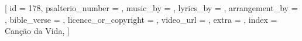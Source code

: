[
    id                     = {178},
    psalterio_number       = {},
    music_by               = {},
    lyrics_by              = {},
    arrangement_by         = {},
    bible_verse            = {},
    licence_or_copyright   = {},
    video_url              = {},
    extra                  = {},
    index                  = {Canção da Vida},
]


\beginverse


\endverse


\beginchorus


\endchorus


\beginverse


\endverse



\endsong
